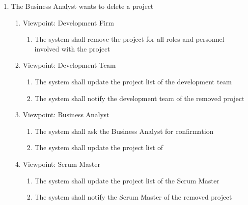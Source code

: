 \documentclass[12pt, titlepage]{article}
\begin{document}
\begin{enumerate}[{BE}1.]
    \item The Business Analyst wants to delete a project
    \begin{enumerate}[{VP}1.] 
        \item Viewpoint: Development Firm
            \begin{enumerate}
                \item The system shall remove the project for all roles and personnel involved with the project
            \end{enumerate}
        \item Viewpoint: Development Team
            \begin{enumerate}
                \item The system shall update the project list of the development team
                \item The system shall notify the development team of the removed project
            \end{enumerate}
        \item Viewpoint: Business Analyst
            \begin{enumerate}
                \item The system shall ask the Business Analyst for confirmation
                \item The system shall update the project list of
            \end{enumerate}
        \item Viewpoint: Scrum Master
            \begin{enumerate}
                \item The system shall update the project list of the Scrum Master
                \item The system shall notify the Scrum Master of the removed project
            \end{enumerate}
    \end{enumerate}
    

\end{enumerate}
\end{document}
